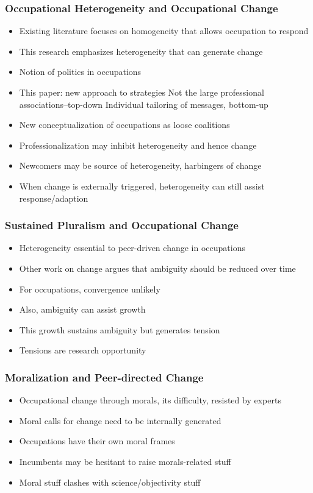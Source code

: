 \documentclass{article}
\begin{document}
	\subsubsection*{Occupational Heterogeneity and Occupational Change}
	\begin{itemize}
		\item Existing literature focuses on homogeneity that allows occupation to respond
		\item This research emphasizes heterogeneity that can generate change
		\item Notion of politics in occupations
		\item This paper: new approach to strategies
			\subitem Not the large professional associations--top-down
			\subitem Individual tailoring of messages, bottom-up
		\item New conceptualization of occupations as loose coalitions
		\item Professionalization may inhibit heterogeneity and hence change
		\item Newcomers may be source of heterogeneity, harbingers of change
		\item When change is externally triggered, heterogeneity can still assist response/adaption
	\end{itemize}
	
	\subsubsection*{Sustained Pluralism and Occupational Change}
	\begin{itemize}
		\item Heterogeneity essential to peer-driven change in occupations
		\item Other work on change argues that ambiguity should be reduced over time
		\item For occupations, convergence unlikely
		\item Also, ambiguity can assist growth
		\item This growth sustains ambiguity but generates tension
		\item Tensions are research opportunity
	\end{itemize}
	
	\subsubsection*{Moralization and Peer-directed Change}
	\begin{itemize}
		\item Occupational change through morals, its difficulty, resisted by experts
		\item Moral calls for change need to be internally generated
		\item Occupations have their own moral frames
		\item Incumbents may be hesitant to raise morals-related stuff
		\item Moral stuff clashes with science/objectivity stuff
	\end{itemize}
	
\end{document}

